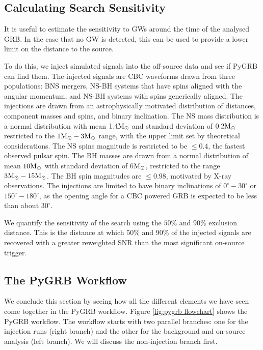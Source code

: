 \documentclass[11pt]{cuthesis}
\begin{document}
\subsection{Calculating Search Sensitivity} \label{sec:pygrb sensitivity}
It is useful to estimate the sensitivity to GWs around the time of the analysed GRB. In the case that no GW is detected, this can be used to provide a lower limit on the distance to the source.  

To do this, we inject simulated signals into the off-source data and see if PyGRB can find them. The injected signals are CBC waveforms drawn from three populations: BNS mergers, NS-BH systems that have spins aligned with the angular momentum, and NS-BH systems with spins generically aligned. The injections are drawn from an astrophysically motivated distribution of distances, component masses and spins, and binary inclination. The NS mass distribution is a normal distribution with mean $1.4 \textup{M}_\odot$ and standard deviation of $0.2 \textup {M}_\odot$ \cite{Kiziltan_2013}\cite{ozel} restricted to the $1 \textup{M}_\odot-3\textup {M}_\odot$ range, with the upper limit set by theoretical considerations. \cite{Kalogera_1996} The NS spins magnitude is restricted to be $\leq 0.4$, the fastest observed pulsar spin. \cite{Hessels1901} The BH masses are drawn from a normal distribution of mean $10 \textup{M}_\odot$ with standard deviation of 6$ \textup{M}_\odot$, restricted to the range $3 \textup{M}_\odot-15 \textup{M}_\odot$. The BH spin magnitudes are $\leq 0.98$, motivated by X-ray observations.  \cite{ozel_2010} The injections are limited to have binary inclinations of $0^\circ-30^\circ$ or $150^\circ-180^\circ$, as the opening angle for a CBC powered GRB is expected to be less than about $30^\circ$. \cite{Lazzati_afterglow}

We quantify the sensitivity of the search using the $50\%$ and $90\%$  exclusion distance. This is the distance at which $50\%$ and $90\%$ of the injected signals are recovered with a greater reweighted SNR than the most significant on-source trigger. 

\subsection{The PyGRB Workflow}
We conclude this section by seeing how all the different elements we have seen come together in the PyGRB workflow. Figure \ref{fig:pygrb flowchart} shows the PyGRB workflow. The workflow starts with two parallel branches: one for the injection runs (right branch) and the other for the background and on-source analysis (left branch). We will discuss the non-injection branch first. 
\end{document}
